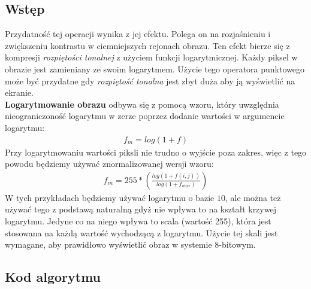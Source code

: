 \documentclass[a4paper,12pt]{book}
\begin{document}
\subsection*{Wstęp}
Przydatność tej operacji wynika z jej efektu. Polega on na rozjaśnieniu i zwiększeniu kontrastu w ciemniejszych rejonach obrazu. Ten efekt bierze się z kompresji \textit{rozpiętości tonalnej} z użyciem funkcji logarytmicznej. Każdy piksel w obrazie jest zamieniany ze swoim logarytmem. Użycie tego operatora punktowego może być przydatne gdy \textit{rozpiętość tonalna} jest zbyt duża aby ją wyświetlić na ekranie. \\
\textbf{Logarytmowanie obrazu} odbywa się z pomocą wzoru, który uwzględnia nieograniczoność logarytmu w zerze poprzez dodanie wartości w argumencie logarytmu: 
\begin{gather}
	f_m = log(1 + f)
\end{gather}
Przy logarytmowaniu wartości piksli nie trudno o wyjście poza zakres, więc z tego powodu będziemy używać znormalizowanej wersji wzoru: 
\begin{gather}
	f_m = 255 * \left( \frac{log(1 + f(i,j))}{log(1 + f_{max})}\right)
\end{gather}
W tych przykładach będziemy używać logarytmu o bazie $10$, ale można też używać tego z podstawą naturalną gdyż nie wpływa to na kształt krzywej logarytmu. Jedyne co na niego wpływa to scala (wartość 255), która jest stosowana na każdą wartość wychodzącą z logarytmu. Użycie tej skali jest wymagane, aby prawidłowo wyświetlić obraz w systemie 8-bitowym. 

\subsection*{Kod algorytmu}
\end{document}

